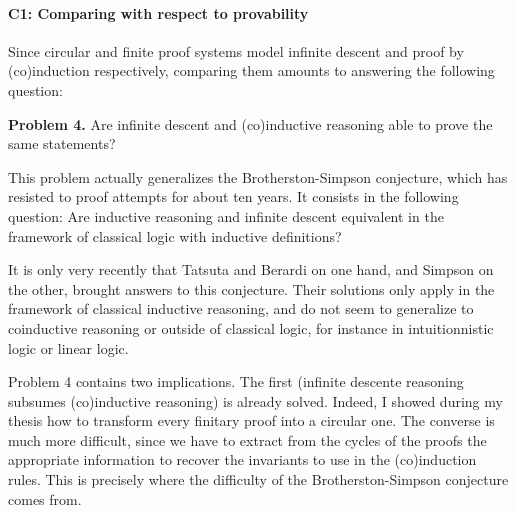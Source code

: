 \documentclass[11pt,twocolumn]{article}
\begin{document}
\medskip{}

\label{ComparaisonParkCirc}

\paragraph{C1: Comparing with respect to provability}

Since circular and finite proof systems model infinite descent and proof by (co)induction respectively, comparing them amounts to answering the following question:
\begin{center}
\begin{bclogo}[logo= ,arrondi = 0.1, couleur = green!10,  epBarre = 0]{}
  \vspace{-10pt}
  \textbf{Problem 4.}
Are infinite descent and (co)inductive reasoning able to prove the same statements?

\end{bclogo}
\end{center}

This problem actually generalizes the Brotherston-Simpson conjecture, which has resisted to proof attempts for about ten years. It consists in the following question: Are inductive reasoning and infinite descent equivalent in the framework of classical logic with inductive definitions?


It is only very recently that Tatsuta and Berardi \cite{BerardiT17fossacs, BerardiT17lics} on one hand, and Simpson \cite{Simpson17fossacs} on the other, brought answers to this conjecture. Their solutions only apply in the framework of classical inductive reasoning, and do not seem to generalize to coinductive reasoning or outside of classical logic, for instance in intuitionnistic logic or linear logic.


\smallskip
Problem 4 contains two implications. The first (infinite descente reasoning subsumes (co)inductive reasoning) is already solved. Indeed, I showed during my thesis how to transform every finitary proof into a circular one. The converse is much more difficult, since we have to extract from the cycles of the proofs the appropriate information to recover the invariants to use in the (co)induction rules. This is precisely where the difficulty of the Brotherston-Simpson conjecture comes from.
\end{document}
